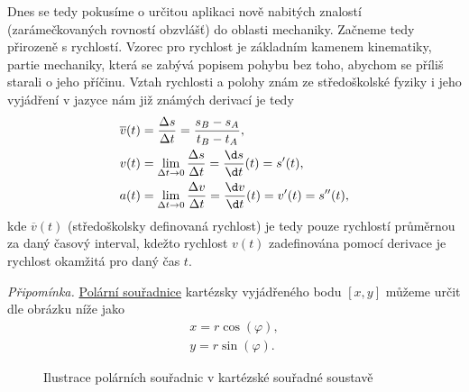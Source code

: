 \documentclass[11pt,a4paper]{report}
\begin{document}
	Dnes se tedy pokusíme o určitou aplikaci nově nabitých znalostí (zarámečkovaných rovností obzvlášť) do oblasti mechaniky. Začneme tedy přirozeně s rychlostí. Vzorec pro rychlost je základním kamenem kinematiky, partie mechaniky, která se zabývá popisem pohybu bez toho, abychom se příliš starali o jeho příčinu. Vztah rychlosti a polohy znám ze středoškolské fyziky i jeho vyjádření v jazyce nám již známých derivací je tedy
	\begin{align*}
		\overline v(t) &= \frac{\Delta s}{\Delta t} = \frac{s_B - s_A}{t_B-t_A},
	\\
		v(t) &= \lim\limits_{\Delta t \to 0} \frac{\Delta s}{\Delta t} = \frac{\d s}{\d t}(t) = s'(t),
	\\
		a(t) &= \lim\limits_{\Delta t \to 0} \frac{\Delta v}{\Delta t} = \frac{\d v}{\d t}(t) = v'(t) = s''(t),
	\end{align*}
	kde $\overline v(t)$ (středoškolsky definovaná rychlost) je tedy pouze rychlostí průměrnou za daný časový interval, kdežto rychlost $v(t)$ zadefinována pomocí derivace je rychlost okamžitá pro daný čas $t$.
	
	\noindent
	\textit{Připomínka.} \quad \underline{Polární souřadnice} kartézsky vyjádřeného bodu $[x,y]$ můžeme určit dle obrázku níže jako
	\begin{align*}
	x = r \cos(\varphi),
	\\
	y = r \sin(\varphi).
	\end{align*}
	
	\begin{figure}[h!] \begin{center}
			\caption{Ilustrace polárních souřadnic v kartézské souřadné soustavě}
	\end{center} \end{figure}
	
\end{document}

